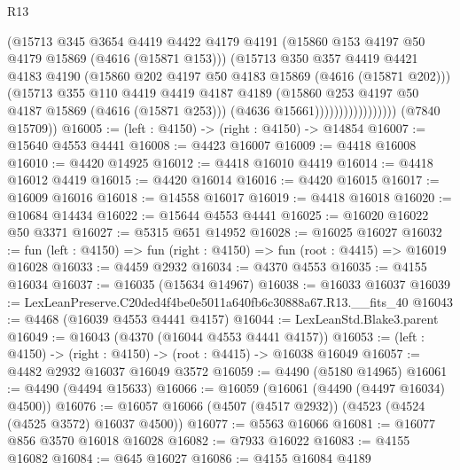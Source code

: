 \begin{lexlean}{R13}
\begin{coremodule}
                                (@15713
                                  @345
                                  @3654
                                  @4419
                                  @4422
                                  @4179
                                  @4191
                                  (@15860 @153 @4197 @50 @4179 @15869 (@4616 (@15871 @153)))
                                  (@15713
                                    @350
                                    @357
                                    @4419
                                    @4421
                                    @4183
                                    @4190
                                    (@15860 @202 @4197 @50 @4183 @15869 (@4616 (@15871 @202)))
                                    (@15713
                                      @355
                                      @110
                                      @4419
                                      @4419
                                      @4187
                                      @4189
                                      (@15860 @253 @4197 @50 @4187 @15869 (@4616 (@15871 @253)))
                                      (@4636 @15661)))))))))))))))))
      (@7840 @15709))
@16005 := (left : @4150) -> (right : @4150) -> @14854
@16007 := @15640 @4553 @4441
@16008 := @4423 @16007
@16009 := @4418 @16008
@16010 := @4420 @14925
@16012 := @4418 @16010 @4419
@16014 := @4418 @16012 @4419
@16015 := @4420 @16014
@16016 := @4420 @16015
@16017 := @16009 @16016
@16018 := @14558 @16017
@16019 := @4418 @16018
@16020 := @10684 @14434
@16022 := @15644 @4553 @4441
@16025 := @16020 @16022 @50 @3371
@16027 := @5315 @651 @14952
@16028 := @16025 @16027
@16032 := fun (left : @4150) => fun (right : @4150) => fun (root : @4415) => @16019 @16028
@16033 := @4459 @2932
@16034 := @4370 @4553
@16035 := @4155 @16034
@16037 := @16035 (@15634 @14967)
@16038 := @16033 @16037
@16039 := LexLeanPreserve.C20ded4f4be0e5011a640fb6c30888a67.R13.__fits_40
@16043 := @4468 (@16039 @4553 @4441 @4157)
@16044 := LexLeanStd.Blake3.parent
@16049 := @16043 (@4370 (@16044 @4553 @4441 @4157))
@16053 := (left : @4150) -> (right : @4150) -> (root : @4415) -> @16038 @16049
@16057 := @4482 @2932 @16037 @16049 @3572
@16059 := @4490 (@5180 @14965)
@16061 := @4490 (@4494 @15633)
@16066 := @16059 (@16061 (@4490 (@4497 @16034) @4500))
@16076 := @16057 @16066 (@4507 (@4517 @2932)) (@4523 (@4524 (@4525 @3572) @16037 @4500))
@16077 := @5563 @16066
@16081 := @16077 @856 @3570 @16018 @16028
@16082 := @7933 @16022
@16083 := @4155 @16082
@16084 := @645 @16027
@16086 := @4155 @16084 @4189

\end{coremodule}
\end{lexlean}
